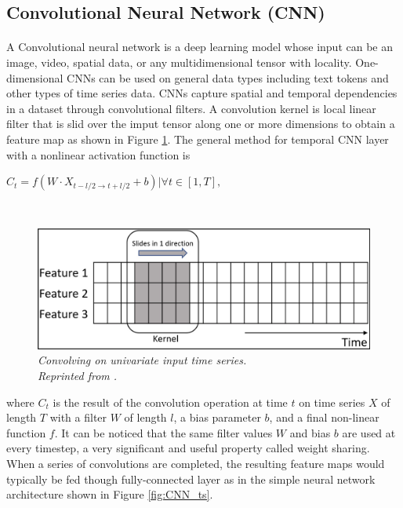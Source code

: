 \subsection{Convolutional Neural Network (CNN)}
\paragraph{}
A Convolutional neural network is a deep learning model whose input can be an image, video, spatial data, or any multidimensional tensor with locality. One-dimensional CNNs can be used on general data types including text tokens and other types of time series data. CNNs capture spatial and temporal dependencies in a dataset through convolutional filters. A convolution kernel is local linear filter that is slid over the imput tensor along one or more dimensions to obtain a feature map as shown in Figure \ref{fig:CNN}. The general method for temporal CNN layer with a nonlinear activation function is

\hfil $C_t = f(W \cdot X_{t-l/2 \to t+l/2} + b) | \forall t \in [1, T], $ \par \

\begin{figure}[H]
  \centering
  \caption[Convolving on univariate input time series.]{\emph{Convolving on univariate input time series. \\
  Reprinted from \citeauthor{ismail_fawaz_forestier_weber_idoumghar_muller_2019} \citeyear{ismail_fawaz_forestier_weber_idoumghar_muller_2019}.}}\label{fig:CNN}
  \includegraphics[scale = 0.3]{figures/CNN.jpg}  
\end{figure}


where $C_t$ is the result of the convolution operation at time $t$ on time series $X$ of length $T$ with a filter $W$ of length $l$, a bias parameter $b$, and a final non-linear function $f$. It can be noticed that the same filter values $W$ and bias $b$ are used at every timestep, a very significant and useful property called weight sharing. When a series of convolutions are completed, the resulting feature maps would typically be fed though fully-connected layer as in the simple neural network architecture shown in Figure \ref{fig:CNN_ts}.

